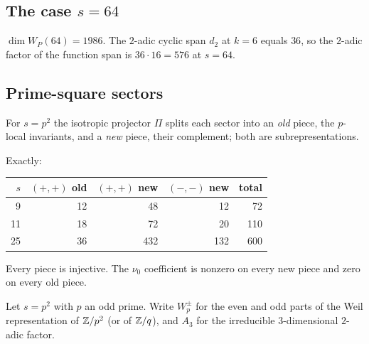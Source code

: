 \subsection{The case $s=64$}\label{sec:s64}
\begin{proposition}[$s=64$]\label{prop:s64}
$\dim W_P(64)=1986$. The $2$-adic cyclic span $d_2$ at $k=6$ equals $36$, so the $2$-adic factor of the function span is $36\cdot16=576$ at $s=64$.
\end{proposition}

\subsection{Prime-square sectors}\label{sec:psq}
For $s=p^2$ the isotropic projector $\Pi$ splits each sector into an \emph{old} piece, the $p$-local invariants, and a \emph{new} piece, their complement; both are
subrepresentations.
\begin{proposition}\label{prop:psq5}
Exactly:
\begin{center}\small\begin{tabular}{rrrrr}\toprule $s$&$(+,+)$ old&$(+,+)$ new&$(-,-)$ new&total\\\midrule 9&12&48&12&72\\ 11&18&72&20&110\\ 25&36&432&132&600\\\bottomrule\end{tabular}\end{center}
Every piece is injective. The $\nu_0$ coefficient is nonzero on every new piece and zero on every old piece.
\end{proposition}
Let $s=p^2$ with $p$ an odd prime. Write $W_p^\pm$ for the even and odd parts of the Weil representation of $\mathbb{Z}/p^2$ (or of $\mathbb{Z}/q$), and $A_3$ for the irreducible $3$-dimensional $2$-adic factor.
